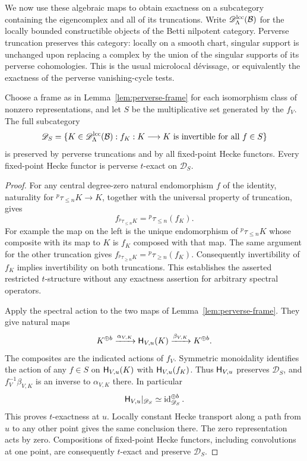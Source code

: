 We now use these algebraic maps to obtain exactness on a subcategory
containing the eigencomplex and all of its truncations.  Write
$\mathscr D^{\mathrm{lcc}}_\Lambda(\mathcal B)$ for the locally bounded
constructible objects of the Betti nilpotent category.  Perverse
truncation preserves this category: locally on a smooth chart,
singular support is unchanged upon replacing a complex by the union
of the singular supports of its perverse cohomologies.  This is the
usual microlocal d\'evissage, or equivalently the exactness of the
perverse vanishing-cycle tests.

\begin{lemma}\label{lem:perverse-localized-exactness}
Choose a frame as in Lemma~\ref{lem:perverse-frame} for each
isomorphism class of nonzero representations, and let $S$ be the
multiplicative set generated by the $f_V$.  The full subcategory
\[
 \mathscr D_S=
 \{K\in\mathscr D^{\mathrm{lcc}}_\Lambda(\mathcal B):
        f_K:K\longrightarrow K\text{ is invertible for all }f\in S\}
\]
is preserved by perverse truncations and by all fixed-point Hecke
functors.  Every fixed-point Hecke functor is perverse $t$-exact on
$\mathscr D_S$.
\end{lemma}

\begin{proof}
For any central degree-zero natural endomorphism $f$ of the identity,
naturality for ${}^p\tau_{\le n}K\to K$, together with the universal
property of truncation, gives
\begin{equation}\label{eq:perverse-center-truncation}
 f_{{}^p\tau_{\le n}K}={}^p\tau_{\le n}(f_K).
\end{equation}
For example the map on the left is the unique endomorphism of
${}^p\tau_{\le n}K$ whose composite with its map to $K$ is
$f_K$ composed with that map.  The same argument for the other
truncation gives
$f_{{}^p\tau_{\ge n}K}={}^p\tau_{\ge n}(f_K)$.
Consequently invertibility of $f_K$ implies invertibility on both
truncations.  This establishes the asserted restricted
$t$-structure without any exactness assertion for arbitrary spectral
operators.

Apply the spectral action to the two maps of
Lemma~\ref{lem:perverse-frame}.  They give natural maps
\[
 K^{\oplus b}\xrightarrow{\alpha_{V,K}}
 \mathsf H_{V,u}(K)
 \xrightarrow{\beta_{V,K}}K^{\oplus b}.
\]
The composites are the indicated actions of $f_V$.  Symmetric
monoidality identifies the action of any $f\in S$ on
$\mathsf H_{V,u}(K)$ with $\mathsf H_{V,u}(f_K)$.
Thus $\mathsf H_{V,u}$ preserves $\mathscr D_S$, and
$f_V^{-1}\beta_{V,K}$ is an inverse to $\alpha_{V,K}$ there.
In particular
\begin{equation}\label{eq:perverse-fixed-frame}
 \mathsf H_{V,u}|_{\mathscr D_S}
         \simeq \operatorname{id}_{\mathscr D_S}^{\oplus b}.
\end{equation}
This proves $t$-exactness at $u$.  Locally constant Hecke transport
along a path from $u$ to any other point gives the same conclusion
there.  The zero representation acts by zero.  Compositions of
fixed-point Hecke functors, including convolutions at one point,
are consequently $t$-exact and preserve $\mathscr D_S$.
\end{proof}

